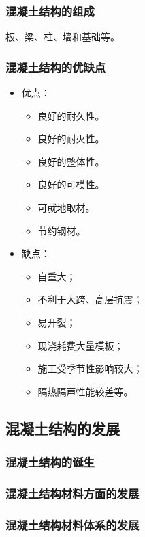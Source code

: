 \documentclass{article}
\begin{document}
\subsubsection{混凝土结构的组成}
\par 板、梁、柱、墙和基础等。
\subsubsection{混凝土结构的优缺点}
\begin{itemize}
      \item 优点：
            \begin{itemize}
                  \item 良好的耐久性。
                  \item 良好的耐火性。
                  \item 良好的整体性。
                  \item 良好的可模性。
                  \item 可就地取材。
                  \item 节约钢材。
            \end{itemize}
      \item 缺点：
            \begin{itemize}
                  \item 自重大；
                  \item 不利于大跨、高层抗震；
                  \item 易开裂；
                  \item 现浇耗费大量模板；
                  \item 施工受季节性影响较大；
                  \item 隔热隔声性能较差等。
            \end{itemize}
\end{itemize}
\subsection{混凝土结构的发展}
\subsubsection{混凝土结构的诞生}
\subsubsection{混凝土结构材料方面的发展}
\subsubsection{混凝土结构材料体系的发展}
\end{document}
